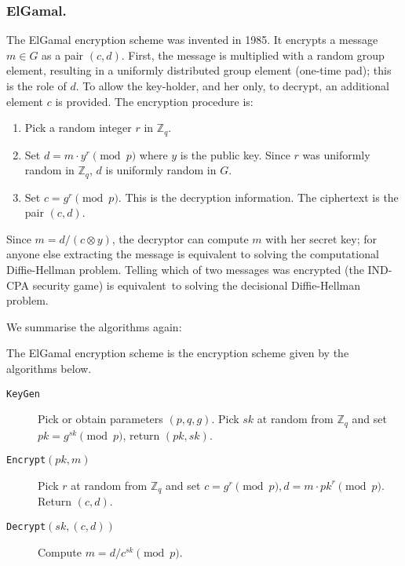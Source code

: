 \documentclass{llncs}
\newcommand{\alg}[1]{\textup{\texttt{#1}}}
\begin{document}
\subsubsection{ElGamal.}
The ElGamal encryption scheme \cite{E85} was invented in 1985.
It encrypts a message $m \in G$ as a pair $(c, d)$.
First, the message is multiplied with a random group element, resulting in a
uniformly distributed group element (one-time pad); this is the role of $d$.
To allow the key-holder, and her only, to decrypt, an additional element $c$ is provided. The encryption procedure is:
\begin{enumerate}
\item Pick a random integer $r$ in $\mathbb Z_q$.
\item Set $d = m \cdot y^r \pmod{p}$ where $y$ is the public key. Since $r$ was
uniformly random in $\mathbb Z_q$, $d$ is uniformly random in $G$.
\item Set $c = g^r \pmod{p}$. This is the decryption information.
The ciphertext is the pair $(c, d)$.
\end{enumerate}
Since $m = d/(c \otimes y)$, the decryptor can compute $m$ with her secret key;
for anyone else extracting the message is equivalent to solving the
computational Diffie-Hellman problem. Telling which of two messages was
encrypted (the IND-CPA security game) is equivalent\footnotemark\ to solving the
decisional Diffie-Hellman problem.

We summarise the algorithms again:
\begin{definition}
The ElGamal encryption scheme is the encryption scheme given by the algorithms below.
\end{definition}
\begin{description}

\item[\alg{KeyGen}] Pick or obtain parameters $(p, q, g)$. Pick $sk$ at random
from $\mathbb Z_q$ and set $pk = g^{sk} \pmod{p}$, return $(pk, sk)$.

\item[\alg{Encrypt}$(pk, m)$] Pick $r$ at random from $\mathbb Z_q$ and set
$c = g^r \pmod{p}, d = m \cdot pk^r \pmod{p}$. Return $(c, d)$.

\item[\alg{Decrypt}$(sk, (c, d))$] Compute $m = d / c^{sk} \pmod{p}$.
\end{description}
\end{document}
